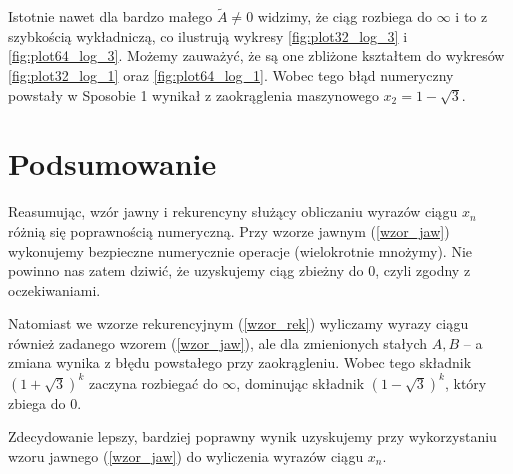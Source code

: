\documentclass{article}
\begin{document}
\noindent Istotnie nawet dla bardzo małego \(\tilde{A} \neq 0\) widzimy, że ciąg rozbiega do \(\infty\) i to z szybkością wykładniczą, co ilustrują wykresy \ref{fig:plot32_log_3} i \ref{fig:plot64_log_3}. Możemy zauważyć, że są one zbliżone kształtem do wykresów \ref{fig:plot32_log_1} oraz \ref{fig:plot64_log_1}. Wobec tego błąd numeryczny powstały w Sposobie 1 wynikał z zaokrąglenia maszynowego \(x_2 = 1 - \sqrt{3} \). 


\newpage

\section{Podsumowanie}

Reasumując, wzór jawny i rekurencyny służący obliczaniu wyrazów ciągu \(x_n\) różnią się poprawnością numeryczną. Przy wzorze jawnym (\ref{wzor_jaw}) wykonujemy bezpieczne numerycznie operacje (wielokrotnie mnożymy). Nie powinno nas zatem dziwić, że uzyskujemy ciąg zbieżny do 0, czyli zgodny z oczekiwaniami.

\noindent Natomiast we wzorze rekurencyjnym (\ref{wzor_rek}) wyliczamy wyrazy ciągu również zadanego wzorem (\ref{wzor_jaw}), ale dla zmienionych stałych \(A, B\) -- a zmiana wynika z błędu powstałego przy zaokrągleniu. Wobec tego składnik \( (1+\sqrt{3})^k \) zaczyna rozbiegać do \(\infty\), dominując składnik \( (1-\sqrt{3})^k \), który zbiega do 0. 

\noindent Zdecydowanie lepszy, bardziej poprawny wynik uzyskujemy przy wykorzystaniu wzoru jawnego (\ref{wzor_jaw}) do wyliczenia wyrazów ciągu \( x_n \).
\end{document}
